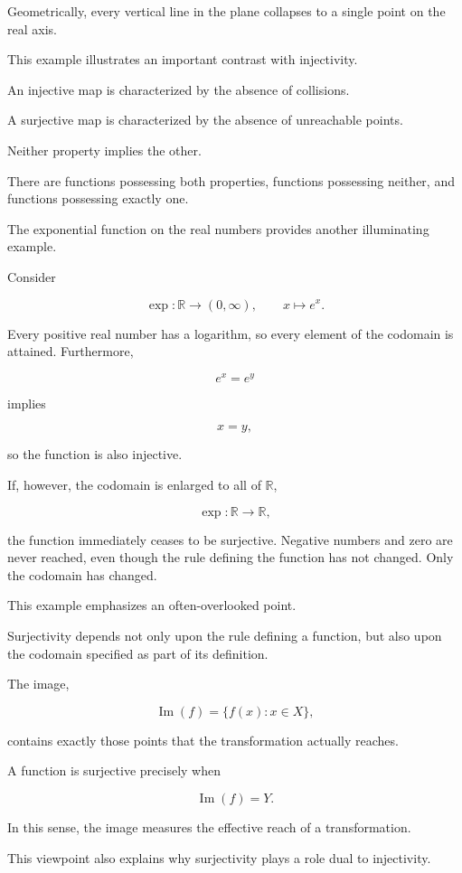 \documentclass[11pt]{book}
\numberwithin{equation}{chapter}
\theoremstyle{definition}
\theoremstyle{plain}
\theoremstyle{remark}
\DeclareMathOperator{\Image}{Im}
\begin{document}
Geometrically, every vertical line in the plane collapses to a single point on the real axis.

This example illustrates an important contrast with injectivity.

An injective map is characterized by the absence of collisions.

A surjective map is characterized by the absence of unreachable points.

Neither property implies the other.

There are functions possessing both properties, functions possessing neither, and functions possessing exactly one.

The exponential function on the real numbers provides another illuminating example.

Consider

\[
\exp:\mathbb{R}\rightarrow(0,\infty),
\qquad
x\mapsto e^{x}.
\]

Every positive real number has a logarithm, so every element of the codomain is attained. Furthermore,

\[
e^{x}=e^{y}
\]

implies

\[
x=y,
\]

so the function is also injective.

If, however, the codomain is enlarged to all of \(\mathbb{R}\),

\[
\exp:\mathbb{R}\rightarrow\mathbb{R},
\]

the function immediately ceases to be surjective. Negative numbers and zero are never reached, even though the rule defining the function has not changed. Only the codomain has changed.

This example emphasizes an often-overlooked point.

Surjectivity depends not only upon the rule defining a function, but also upon the codomain specified as part of its definition.

The image,

\[
\Image(f)
=
\{f(x):x\in X\},
\]

contains exactly those points that the transformation actually reaches.

A function is surjective precisely when

\[
\Image(f)=Y.
\]

In this sense, the image measures the effective reach of a transformation.

This viewpoint also explains why surjectivity plays a role dual to injectivity.
\end{document}

